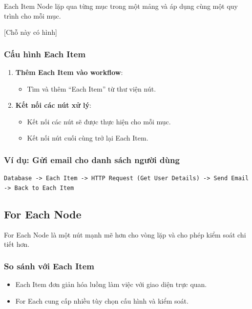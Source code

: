 Each Item Node lặp qua từng mục trong một mảng và áp dụng cùng một quy trình cho mỗi mục.

[Chỗ này có hình]

\subsubsection{Cấu hình Each Item}

\begin{enumerate}
  \item \textbf{Thêm Each Item vào workflow}:
  \begin{itemize}
    \item Tìm và thêm ``Each Item'' từ thư viện nút.
  \end{itemize}

  \item \textbf{Kết nối các nút xử lý}:
  \begin{itemize}
    \item Kết nối các nút sẽ được thực hiện cho mỗi mục.
    \item Kết nối nút cuối cùng trở lại Each Item.
  \end{itemize}
\end{enumerate}

\subsubsection{Ví dụ: Gửi email cho danh sách người dùng}

\begin{verbatim}
Database -> Each Item -> HTTP Request (Get User Details) -> Send Email
-> Back to Each Item
\end{verbatim}

\subsection{For Each Node}

For Each Node là một nút mạnh mẽ hơn cho vòng lặp và cho phép kiểm soát chi tiết hơn.

\subsubsection{So sánh với Each Item}

\begin{itemize}
  \item Each Item đơn giản hóa luồng làm việc với giao diện trực quan.
  \item For Each cung cấp nhiều tùy chọn cấu hình và kiểm soát.
\end{itemize}

